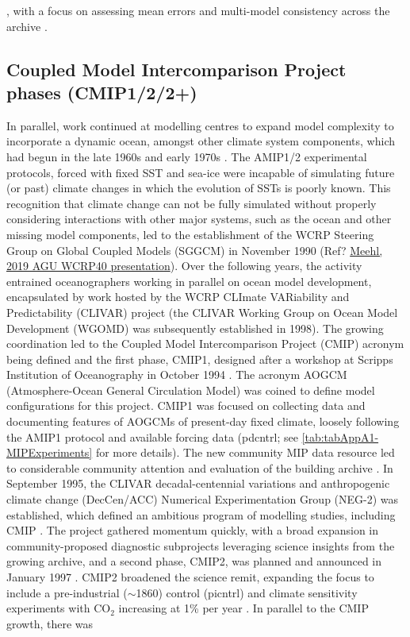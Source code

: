 \documentclass[gmd, preprint]{copernicus}
\def\cred#1{{\color{red}#1}}
\begin{document}
\citep[SAR;][]{gates_climate_1996}, with a focus on assessing mean errors and multi-model consistency across the archive \citep{gates_amip_1995}.


\subsection{Coupled Model Intercomparison Project phases (CMIP1/2/2+)}
\label{sec:cmip1And2And2Plus}
In parallel, work continued at modelling centres to expand model complexity to incorporate a dynamic ocean, amongst other climate system components, which had begun in the late 1960s and early 1970s \citep[e.g.,][]{manabe_climate_1969-1,manabe_global_1975,bryan_global_1975}. The AMIP1/2 experimental protocols, forced with fixed SST and sea-ice were incapable of simulating future (or past) climate changes in which the evolution of SSTs is poorly known. This recognition that climate change can not be fully simulated without properly considering interactions with other major systems, such as the ocean and other missing model components, led to the establishment of the WCRP Steering Group on Global Coupled Models (SGGCM) in November 1990 (\cred{Ref? \href{https://www.wcrp-climate.org/images/AGU2019/presentations/Symposium/11-Meehl_WCRP40.pdf}{Meehl, 2019 AGU WCRP40 presentation}}). Over the following years, the activity entrained oceanographers working in parallel on ocean model development, encapsulated by work hosted by the WCRP CLImate VARiability and Predictability (CLIVAR) project (the CLIVAR Working Group on Ocean Model Development (WGOMD) was subsequently established in 1998). The growing coordination led to the Coupled Model Intercomparison Project (CMIP) acronym being defined and the first phase, CMIP1, designed after a workshop at Scripps Institution of Oceanography in October 1994 \citep{meehl_global_1995}. The acronym AOGCM (Atmosphere-Ocean General Circulation Model) was coined to define model configurations for this project. CMIP1 was focused on collecting data and documenting features of AOGCMs of present-day fixed climate, loosely following the AMIP1 protocol and available forcing data (pdcntrl; see \autoref{tab:tabAppA1-MIPExperiments} for more details). The new community MIP data resource led to considerable community attention and evaluation of the building archive \citep{villwock_6th_2003, lambert_cmip1_2001, raisanen_co2-induced_2001}. In September 1995, the CLIVAR decadal-centennial variations and anthropogenic climate change (DecCen/ACC) Numerical Experimentation Group (NEG-2) was established, which defined an ambitious program of modelling studies, including CMIP \citep{villwock_what_1996, coughlan_report_1996}. The project gathered momentum quickly, with a broad expansion in community-proposed diagnostic subprojects leveraging science insights from the growing archive, and a second phase, CMIP2, was planned and announced in January 1997 \citep{meehl_intercomparison_1997, meehl_coupled_2000}. CMIP2 broadened the science remit, expanding the focus to include a pre-industrial ($\sim$1860) control (picntrl) and climate sensitivity experiments with CO$_{2}$ increasing at 1\% per year \citep[1pctto2x, 1pctto4x;][]{villwock_6th_2003, meehl_cmip_2003}. In parallel to the CMIP growth, there was 
\end{document}
